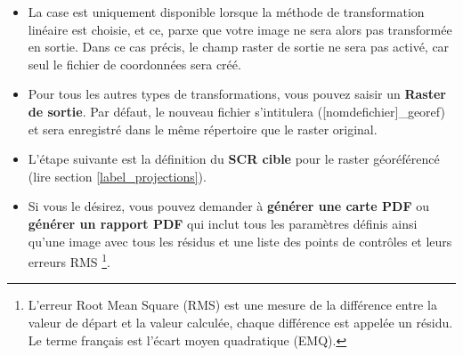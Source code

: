 \begin{itemize}[label=--]
\item La case  est uniquement disponible lorsque la méthode de transformation linéaire est choisie, et ce, parxe que votre image ne sera alors pas transformée en sortie. Dans ce cas précis, le champ raster de sortie ne sera pas activé, car seul le fichier de coordonnées sera créé.
\item Pour tous les autres types de transformations, vous pouvez saisir un \textbf{Raster de sortie}. Par défaut, le nouveau fichier s'intitulera ([nomdefichier]\_georef) et sera enregistré dans le même répertoire que le raster original.
\item L'étape suivante est la définition du \textbf{SCR cible} pour le raster géoréférencé (lire section \ref{label_projections}). 
\item Si vous le désirez, vous pouvez demander à \textbf{générer une carte PDF} ou \textbf{générer un rapport PDF} qui inclut tous les paramètres définis ainsi qu'une image avec tous les résidus et une liste des points de contrôles et leurs erreurs RMS \footnote{L'erreur Root Mean Square (RMS) est une mesure de la différence entre la valeur de départ et la valeur calculée, chaque différence est appelée un résidu. Le terme français est l'écart moyen quadratique (EMQ).}.

\end{itemize}
